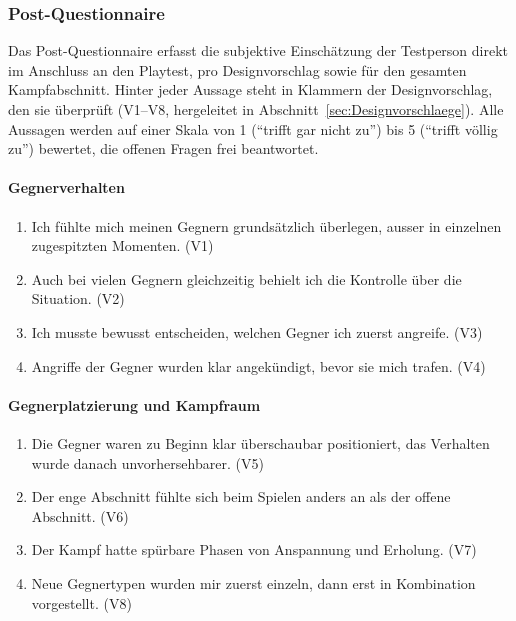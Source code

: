 \documentclass[../Main.tex]{subfiles}
\begin{document}
\subsubsection{Post-Questionnaire} \label{sec:PostQuestionnaire}
 
Das Post-Questionnaire erfasst die subjektive Einschätzung der Testperson direkt im Anschluss an den Playtest, pro Designvorschlag sowie für den gesamten Kampfabschnitt. Hinter jeder Aussage steht in Klammern der Designvorschlag, den sie überprüft (V1--V8, hergeleitet in Abschnitt~\ref{sec:Designvorschlaege}). Alle Aussagen werden auf einer Skala von 1 (\enquote{trifft gar nicht zu}) bis 5 (\enquote{trifft völlig zu}) bewertet, die offenen Fragen frei beantwortet.
 
\paragraph{Gegnerverhalten}
\begin{enumerate}[label=\textbf{Q\arabic*}, leftmargin=1.5cm, itemsep=0.5em]
    \item Ich fühlte mich meinen Gegnern grundsätzlich überlegen, ausser in einzelnen zugespitzten Momenten. \hfill (V1)
    \item Auch bei vielen Gegnern gleichzeitig behielt ich die Kontrolle über die Situation. \hfill (V2)
    \item Ich musste bewusst entscheiden, welchen Gegner ich zuerst angreife. \hfill (V3)
    \item Angriffe der Gegner wurden klar angekündigt, bevor sie mich trafen. \hfill (V4)
\end{enumerate}
 
\paragraph{Gegnerplatzierung und Kampfraum}
\begin{enumerate}[label=\textbf{Q\arabic*}, leftmargin=1.5cm, itemsep=0.5em, resume]
    \item Die Gegner waren zu Beginn klar überschaubar positioniert, das Verhalten wurde danach unvorhersehbarer. \hfill (V5)
    \item Der enge Abschnitt fühlte sich beim Spielen anders an als der offene Abschnitt. \hfill (V6)
    \item Der Kampf hatte spürbare Phasen von Anspannung und Erholung. \hfill (V7)
    \item Neue Gegnertypen wurden mir zuerst einzeln, dann erst in Kombination vorgestellt. \hfill (V8)
\end{enumerate}
 
\end{document}
